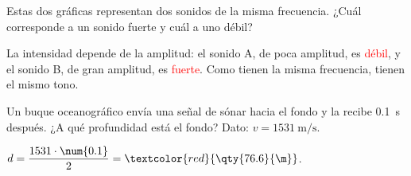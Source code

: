\begin{exercise}
    Estas dos gráficas representan dos sonidos de la misma frecuencia. ¿Cuál corresponde a un sonido fuerte y cuál a uno débil?
    \begin{center}
        \qquad
    \end{center}
    \begin{solu}
        La intensidad depende de la amplitud: el sonido A, de poca amplitud, es \textcolor{red}{débil}, y el sonido B, de gran amplitud, es \textcolor{red}{fuerte}. Como tienen la misma frecuencia, tienen el mismo tono.
    \end{solu}
\end{exercise}

\begin{exercise}
    Un buque oceanográfico envía una señal de sónar hacia el fondo y la recibe \qty{0.1}{\s} después. ¿A qué profundidad está el fondo? Dato: \(v = \qty{1531}{\m\per\s}\).
    \begin{solu}
        \(d = \dfrac{1531 \cdot \num{0.1}}{2} = \textcolor{red}{\qty{76.6}{\m}}\).
    \end{solu}
\end{exercise}

